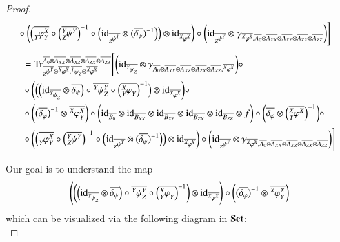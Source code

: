 \documentclass{amsart}
\def\tn{\textnormal}
\def\Trace{\tn{Tr}}
\def\ol{\overline}
\def\id{\tn{id}}
\def\Set{{\bf Set}}
\newcommand{\feeddd}[3]{{\tensor*[^{#2}_{\color{white}{!}}]{{#1}}{^{#3}}}}%
\newcommand{\feeddc}[3]{{\tensor*[^{#2}]{{#1}}{_{#3}}}}
\newcommand{\feedcd}[3]{{\tensor*[_{#2}]{{#1}}{^{#3}}}}
\newcommand{\feedda}[3]{{\tensor*[^{#2}_{\color{white}{!}}]{{#1}}{^{#2}_{#3}}}}
\newcommand{\feedca}[3]{{\tensor*[_{#2}]{{#1}}{_{#2}^{#3}}}}
\newcommand{\feedad}[3]{{\tensor*[^{#2}_{#3}]{{#1}}{^{#2}}}}
\newcommand{\feedac}[3]{{\tensor*[_{#2}^{#3}]{{#1}}{_{#2}}}}
\theoremstyle{remark}
\theoremstyle{definition}
\begin{document}
\begin{proof}
\begin{align*}
&\circ\bigg(\Big(\ol{\feedca{\varphi}{Y}{X}}\circ\Big(\ol{\feedad{\psi}{Y}{Z}}\Big)^{-1}\circ\Big(\id_{\ol{\feedcd{\psi}{Z}{Y}}}\otimes(\ol{\delta_\psi})^{-1}\Big)\Big)\otimes\id_{\ol{\feeddd{\varphi}{X}{X}}}\bigg)\circ\bigg(\id_{\ol{\feedcd{\psi}{Z}{Y}}}\otimes\gamma_{\ol{\feeddd{\varphi}{X}{X}},\ol{A_0}\otimes\ol{A_{XX}}\otimes\ol{A_{XZ}}\otimes\ol{A_{ZX}}\otimes\ol{A_{ZZ}}}\bigg)\Bigg]
\end{align*}
\begin{align*}
&=\Trace^{\ol{A_0}\otimes\ol{A_{XX}}\otimes\ol{A_{XZ}}\otimes\ol{A_{ZX}}\otimes\ol{A_{ZZ}}}_{\ol{\feedcd{\psi}{Z}{Y}}\otimes\ol{\feeddd{\varphi}{X}{X}},\ol{\feeddc{\psi}{Y}{Z}}\otimes\ol{\feeddd{\varphi}{X}{X}}}\Bigg[
\bigg(\id_{\ol{\feeddc{\psi}{Y}{Z}}}\otimes\gamma_{\ol{A_0}\otimes\ol{A_{XX}}\otimes\ol{A_{XZ}}\otimes\ol{A_{ZX}}\otimes\ol{A_{ZZ}},\ol{\feeddd{\varphi}{X}{X}}}\bigg)\circ\\
&\circ\bigg(\Big(\Big(\id_{\ol{\feeddc{\psi}{Y}{Z}}}\otimes\ol{\delta_\psi}\Big)\circ\ol{\feedda{\psi}{Y}{Z}}\circ\Big(\ol{\feedac{\varphi}{Y}{X}}\Big)^{-1}\Big)\otimes\id_{\ol{\feeddd{\varphi}{X}{X}}}\bigg)\circ\\
&\circ\bigg(\big(\ol{\delta_\varphi}\big)^{-1}\otimes\ol{\feedda{\varphi}{X}{Y}}\bigg)\circ\bigg(\id_{\ol{B_0}}\otimes\id_{\ol{B_{XX}}}\otimes\id_{\ol{B_{XZ}}}\otimes\id_{\ol{B_{ZX}}}\otimes\id_{\ol{B_{ZZ}}}\otimes f\bigg)\circ\bigg(\ol{\delta_\varphi}\otimes\Big(\ol{\feedad{\varphi}{X}{Y}}\Big)^{-1}\bigg)\circ\\
&\circ\bigg(\Big(\ol{\feedca{\varphi}{Y}{X}}\circ\Big(\ol{\feedad{\psi}{Y}{Z}}\Big)^{-1}\circ\Big(\id_{\ol{\feedcd{\psi}{Z}{Y}}}\otimes(\ol{\delta_\psi})^{-1}\Big)\Big)\otimes\id_{\ol{\feeddd{\varphi}{X}{X}}}\bigg)\circ\bigg(\id_{\ol{\feedcd{\psi}{Z}{Y}}}\otimes\gamma_{\ol{\feeddd{\varphi}{X}{X}},\ol{A_0}\otimes\ol{A_{XX}}\otimes\ol{A_{XZ}}\otimes\ol{A_{ZX}}\otimes\ol{A_{ZZ}}}\bigg)\Bigg]
\end{align*}

Our goal is to understand the map
\[\Bigg(\bigg(\Big(\id_{\ol{\feeddc{\psi}{Y}{Z}}}\otimes\ol{\delta_\psi}\Big)\circ\ol{\feedda{\psi}{Y}{Z}}\circ\Big(\ol{\feedac{\varphi}{Y}{X}}\Big)^{-1}\bigg)\otimes\id_{\ol{\feeddd{\varphi}{X}{X}}}\Bigg)\circ\bigg(\big(\ol{\delta_\varphi}\big)^{-1}\otimes\ol{\feedda{\varphi}{X}{Y}}\bigg)\]
which can be visualized via the following diagram in $\Set$:\\


\end{proof}
\end{document}
